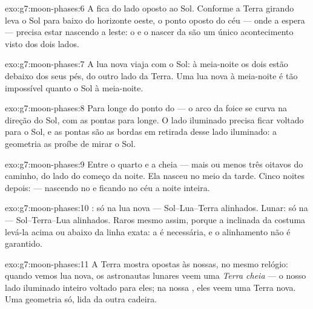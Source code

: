 \begin{solution}{exo:g7:moon-phases:6}
A  fica do lado oposto ao Sol. Conforme a Terra girando leva
o Sol para baixo do horizonte oeste, o ponto oposto do céu --- onde a
 espera --- precisa estar nascendo a leste: o  e o
nascer da  são um único acontecimento visto dos dois lados.
\end{solution}

\begin{solution}{exo:g7:moon-phases:7}
A lua nova viaja com o Sol: à meia-noite os dois estão debaixo dos
seus pés, do outro lado da Terra. Uma lua nova à meia-noite é tão
impossível quanto o Sol à meia-noite.
\end{solution}

\begin{solution}{exo:g7:moon-phases:8}
Para longe do ponto do  --- o arco da foice se curva na
direção do Sol, com as pontas para longe. O lado iluminado precisa
ficar voltado para o Sol, e as pontas são as bordas em retirada desse
lado iluminado: a geometria as proíbe de mirar o Sol.
\end{solution}

\begin{solution}{exo:g7:moon-phases:9}
Entre o quarto  e a cheia --- mais ou menos três oitavos do
caminho, do lado do começo da noite. Ela nasceu no meio da tarde.
Cinco noites depois:  --- nascendo no  e ficando
no céu a noite inteira.
\end{solution}

\begin{solution}{exo:g7:moon-phases:10}
: só na lua nova --- Sol--Lua--Terra alinhados. Lunar:
só na  --- Sol--Terra--Lua alinhados. Raros mesmo assim,
porque a  inclinada da  costuma levá-la acima ou abaixo da
linha exata: a  é necessária, e o alinhamento não é garantido.
\end{solution}

\begin{solution}{exo:g7:moon-phases:11}
A Terra mostra  opostas às nossas, no mesmo relógio: quando
vemos lua nova, os astronautas lunares veem uma \emph{Terra cheia}
--- o nosso lado iluminado inteiro voltado para eles; na nossa , eles veem uma Terra nova. Uma geometria só, lida da outra
cadeira.
\end{solution}

